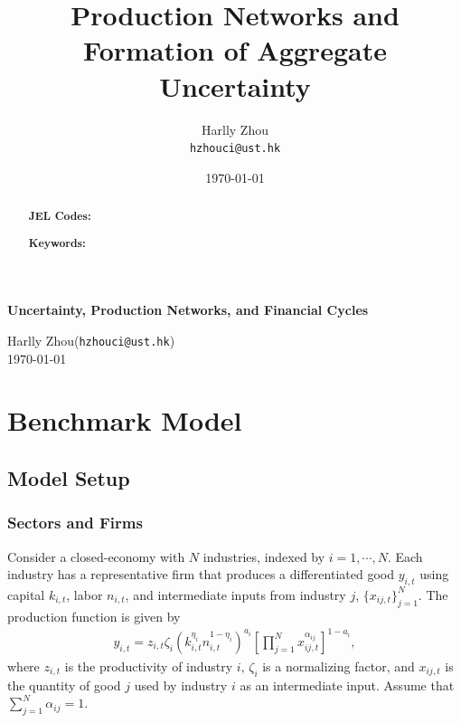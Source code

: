\documentclass[12pt]{article}
\title{Production Networks and Formation of Aggregate Uncertainty}
\author{
Harlly Zhou\footnotemark[1]\\\texttt{hzhouci@ust.hk}
}
\date{\today}
\numberwithin{equation}{section}
\begin{document}
\begin{titlepage}
    \begin{center}
        {\LARGE\bfseries Uncertainty, Production Networks, and Financial Cycles\par}
        \vspace{1.5em}
        {\large
        Harlly Zhou\footnotemark[1] (\texttt{hzhouci@ust.hk})\\
        }
        \vspace{1em}
        \today
    \end{center}
    \vspace{2em}
    \begin{abstract}
        \sloppy
        \noindent 
         \vspace{1em}

        \noindent\textbf{JEL Codes:} 


        \noindent\textbf{Keywords:} 
        \fussy
    \end{abstract}
    \thispagestyle{empty}
    \setcounter{page}{0}
\end{titlepage}


\section{Benchmark Model}\label{sec:benchmark_model}
\subsection{Model Setup}
\subsubsection{Sectors and Firms}

Consider a closed-economy with $N$ industries, indexed by $i=1,\cdots,N$. Each industry has a representative firm that produces a differentiated good $y_{i,t}$ using capital $k_{i,t}$, labor $n_{i,t}$, and intermediate inputs from industry $j$, $\{x_{ij,t}\}_{j=1}^{N}$. The production function is given by
\begin{align}\label{eq:prod_func}
    y_{i,t}
    =
    z_{i,t}\zeta_i
    \left(
        k_{i,t}^{\eta_i}n_{i,t}^{1-\eta_i}
    \right)^{a_i}
    \left[
        \prod_{j=1}^{N}
        x_{ij,t}^{\alpha_{ij}}
    \right]^{1-a_i},
\end{align}
where $z_{i,t}$ is the productivity of industry $i$, $\zeta_i$ is a normalizing factor, and $x_{ij,t}$ is the quantity of good $j$ used by industry $i$ as an intermediate input. Assume that $\sum_{j=1}^{N}\alpha_{ij}=1$.
\end{document}
